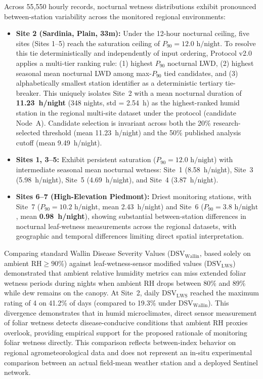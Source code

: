 \documentclass[10pt,twocolumn,a4paper]{article}
\begin{document}
Across 55,550 hourly records, nocturnal wetness distributions exhibit pronounced between-station variability across the monitored regional environments:
\begin{itemize}\setlength{\itemsep}{1pt}\setlength{\parskip}{0pt}
  \item \textbf{Site 2 (Sardinia, Plain, 33m):} Under the 12-hour nocturnal ceiling, five sites (Sites 1--5) reach the saturation ceiling of $P_{90} = 12.0\text{ h/night}$. To resolve this tie deterministically and independently of input ordering, Protocol v2.0 applies a multi-tier ranking rule: (1) highest $P_{90}$ nocturnal LWD, (2) highest seasonal mean nocturnal LWD among max-$P_{90}$ tied candidates, and (3) alphabetically smallest station identifier as a deterministic tertiary tie-breaker. This uniquely isolates Site~2 with a mean nocturnal duration of \textbf{11.23~h/night} (348 nights, std = 2.54~h) as the highest-ranked humid station in the regional multi-site dataset under the protocol (candidate Node~A). Candidate selection is invariant across both the 20\% research-selected threshold (mean 11.23~h/night) and the 50\% published analysis cutoff (mean 9.49~h/night).
  \item \textbf{Sites 1, 3--5:} Exhibit persistent saturation ($P_{90} = 12.0\text{ h/night}$) with intermediate seasonal mean nocturnal wetness: Site~1 (8.58~h/night), Site~3 (5.98~h/night), Site~5 (4.69~h/night), and Site~4 (3.87~h/night).
  \item \textbf{Sites 6--7 (High-Elevation Piedmont):} Driest monitoring stations, with Site~7 ($P_{90} = 10.2\text{ h/night}$, mean 2.43~h/night) and Site~6 ($P_{90} = 3.8\text{ h/night}$, mean \textbf{0.98~h/night}), showing substantial between-station differences in nocturnal leaf-wetness measurements across the regional datasets, with geographic and temporal differences limiting direct spatial interpretation.
\end{itemize}
Comparing standard Wallin Disease Severity Values ($\mathrm{DSV}_{\text{Wallin}}$, based solely on ambient $\mathrm{RH} \ge 90\%$) against leaf-wetness-sensor modified values ($\mathrm{DSV}_{\mathrm{LWS}}$) demonstrated that ambient relative humidity metrics can miss extended foliar wetness periods during nights when ambient RH drops between 80\% and 89\% while dew remains on the canopy. At Site~2, daily $\mathrm{DSV}_{\mathrm{LWS}}$ reached the maximum rating of 4 on 41.2\% of days (compared to 19.3\% under $\mathrm{DSV}_{\text{Wallin}}$). This divergence demonstrates that in humid microclimates, direct sensor measurement of foliar wetness detects disease-conducive conditions that ambient RH proxies overlook, providing empirical support for the proposed rationale of monitoring foliar wetness directly. This comparison reflects between-index behavior on regional agrometeorological data and does not represent an in-situ experimental comparison between an actual field-mean weather station and a deployed Sentinel network.
\end{document}
